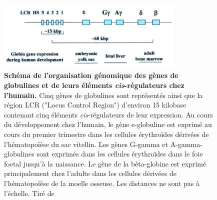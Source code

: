 \begin{figure}[h]
    \centering
    \includegraphics[width=0.8\textwidth, page=1]{figures/chap2/chap2-fig2.png}
    \caption[Schéma de l'organisation génomique des gènes de globulines et de leurs éléments \textit{cis}-régulateurs chez l'humain.]{
    \textbf{Schéma de l'organisation génomique des gènes de globulines et de leurs éléments \textit{cis}-régulateurs chez l'humain.}
    Cinq gènes de globulines sont représentés ainsi que la région LCR ("Locus Control Region") d'environ 15 kilobase contenant cinq éléments \textit{cis}-régulateurs de leur expression. Au cours du développement chez l'humain, le gène e-globuline est exprimé au cours du premier trimestre dans les cellules érythroïdes dérivées de l'hématopoïèse du sac vitellin. Les gènes G-gamma et A-gamma-globulines sont exprimés dans les cellules érythroïdes dans le foie foetal jusqu'à la naissance. Le gène de la bêta-globine est exprimé principalement chez l'adulte dans les cellules dérivées de l'hématopoïèse de la moelle osseuse.
    Les distances ne sont pas à l'échelle. Tiré de \citep{levings_human_2002}\\
    }
    \label{fig:chap2-fig2}
\end{figure} 

